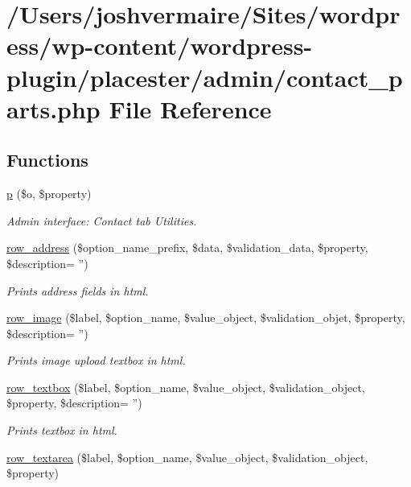 \hypertarget{contact__parts_8php}{
\section{/Users/joshvermaire/Sites/wordpress/wp-\/content/wordpress-\/plugin/placester/admin/contact\_\-parts.php File Reference}
\label{d5/d2d/contact__parts_8php}
}
\subsection*{Functions}
\begin{DoxyCompactItemize}
\item 
\hyperlink{contact__parts_8php_af485f972f0f0ec073357a35b6ed12949}{p} (\$o, \$property)
\begin{DoxyCompactList}\small\item\em Admin interface: Contact tab Utilities. \end{DoxyCompactList}\item 
\hyperlink{contact__parts_8php_aadc3aabc35df6f6dc6bb0faac4ebe3ee}{row\_\-address} (\$option\_\-name\_\-prefix, \$data, \$validation\_\-data, \$property, \$description= '')
\begin{DoxyCompactList}\small\item\em Prints address fields in html. \end{DoxyCompactList}\item 
\hyperlink{contact__parts_8php_ac45bc1f1dde140cded8b3f625f711730}{row\_\-image} (\$label, \$option\_\-name, \$value\_\-object, \$validation\_\-objet, \$property, \$description= '')
\begin{DoxyCompactList}\small\item\em Prints image upload textbox in html. \end{DoxyCompactList}\item 
\hyperlink{contact__parts_8php_a499295254298f0d76cfef25a85862167}{row\_\-textbox} (\$label, \$option\_\-name, \$value\_\-object, \$validation\_\-object, \$property, \$description= '')
\begin{DoxyCompactList}\small\item\em Prints textbox in html. \end{DoxyCompactList}\item 
\hyperlink{contact__parts_8php_ab8b72ba78b23fc0e46854518dd4ef6b0}{row\_\-textarea} (\$label, \$option\_\-name, \$value\_\-object, \$validation\_\-object, \$property)

\end{DoxyCompactItemize}
